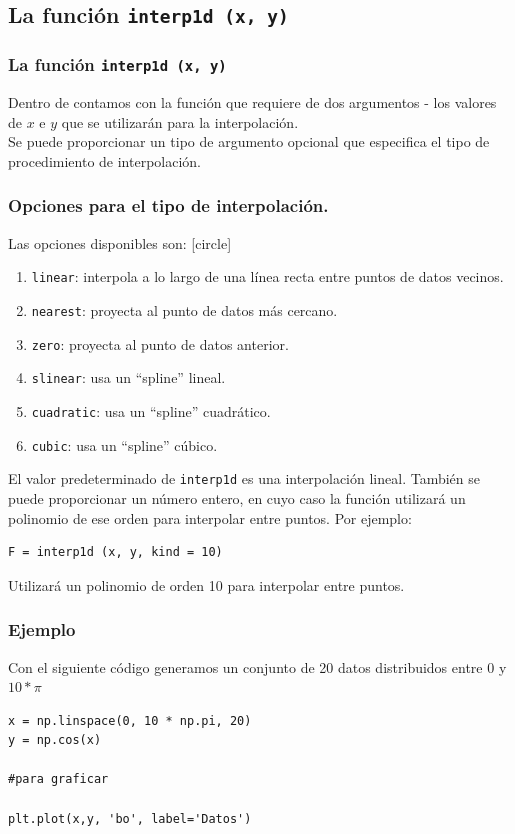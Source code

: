 \subsection{La función \texttt{interp1d (x, y)}}
\begin{frame}
\frametitle{La función \texttt{interp1d (x, y)}}
Dentro de  contamos con la función  que requiere de dos argumentos - los valores de $x$ e $y$ que se utilizarán para la interpolación. 
\\
\bigskip
Se puede proporcionar un tipo de argumento opcional que especifica el tipo de procedimiento de interpolación.
\end{frame}
\begin{frame}
\frametitle{Opciones para el tipo de interpolación.}
Las opciones disponibles son:
[circle]
\begin{enumerate}[<+->]
\item \texttt{linear}: interpola a lo largo de una línea recta entre puntos de datos vecinos.
\item \texttt{nearest}: proyecta al punto de datos más cercano.
\item \texttt{zero}: proyecta al punto de datos anterior.
\item \texttt{slinear}: usa un ``spline'' lineal.
\item \texttt{cuadratic}: usa un ``spline'' cuadrático.
\item \texttt{cubic}: usa un ``spline'' cúbico.
\end{enumerate}
\end{frame}
\begin{frame}[fragile]
El valor predeterminado de \texttt{interp1d} es una interpolación lineal. También se puede proporcionar un número entero, en cuyo caso la función utilizará un polinomio de ese orden para interpolar entre puntos. Por ejemplo:
\begin{verbatim}
F = interp1d (x, y, kind = 10)
\end{verbatim}
Utilizará un polinomio de orden 10 para interpolar entre puntos.
\end{frame}
\begin{frame}[fragile]
\frametitle{Ejemplo}
Con el siguiente código generamos un conjunto de 20 datos distribuidos entre $0$ y $10 * \pi$
\begin{lstlisting}[basicstyle=\ttfamily\normalsize, columns=fullflexible]
x = np.linspace(0, 10 * np.pi, 20)
y = np.cos(x)

#para graficar

plt.plot(x,y, 'bo', label='Datos')
\end{lstlisting}
\end{frame}
